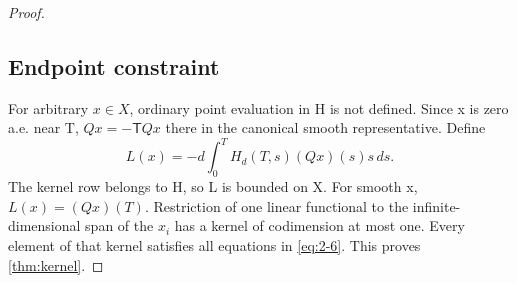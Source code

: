 \begin{proof}
\subsection{Endpoint constraint}

For arbitrary \(x\in X\), ordinary point evaluation in H is not defined. Since x is zero a.e. near T, \(Qx=-\mathsf TQx\) there in the canonical smooth representative. Define
\begin{equation}\label{eq:3-13}
L(x)=-d\int_0^T H_d(T,s)(Qx)(s)s\,ds.
\end{equation}
The kernel row belongs to H, so L is bounded on X. For smooth x, \(L(x)=(Qx)(T)\). Restriction of one linear functional to the infinite-dimensional span of the \(x_i\) has a kernel of codimension at most one. Every element of that kernel satisfies all equations in \eqref{eq:2-6}. This proves \cref{thm:kernel}.
\end{proof}
